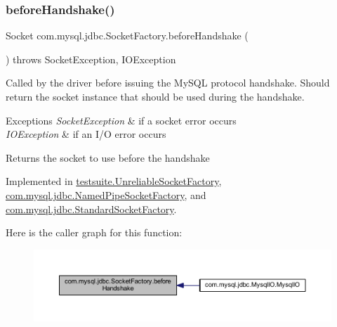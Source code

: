 \subsubsection{\texorpdfstring{before\+Handshake()}{beforeHandshake()}}
{\footnotesize\ttfamily Socket com.\+mysql.\+jdbc.\+Socket\+Factory.\+before\+Handshake (\begin{DoxyParamCaption}{ }\end{DoxyParamCaption}) throws Socket\+Exception, I\+O\+Exception}

Called by the driver before issuing the My\+S\+QL protocol handshake. Should return the socket instance that should be used during the handshake.


\begin{DoxyExceptions}{Exceptions}
{\em Socket\+Exception} & if a socket error occurs \\
\hline
{\em I\+O\+Exception} & if an I/O error occurs\\
\hline
\end{DoxyExceptions}
\begin{DoxyReturn}{Returns}
the socket to use before the handshake 
\end{DoxyReturn}


Implemented in \mbox{\hyperlink{classtestsuite_1_1_unreliable_socket_factory_ad65b14e35905d6b36bf1e93c5b0c90e2}{testsuite.\+Unreliable\+Socket\+Factory}}, \mbox{\hyperlink{classcom_1_1mysql_1_1jdbc_1_1_named_pipe_socket_factory_ad9b744457afb6727e696dc11e69c4b15}{com.\+mysql.\+jdbc.\+Named\+Pipe\+Socket\+Factory}}, and \mbox{\hyperlink{classcom_1_1mysql_1_1jdbc_1_1_standard_socket_factory_a0fc01cf46005340dec4113471621f792}{com.\+mysql.\+jdbc.\+Standard\+Socket\+Factory}}.

Here is the caller graph for this function\+:
\nopagebreak
\begin{figure}[H]
\begin{center}
\leavevmode
\includegraphics[width=350pt]{interfacecom_1_1mysql_1_1jdbc_1_1_socket_factory_aa9a78553a76681f49c734aaa3f8f126b_icgraph}
\end{center}
\end{figure}
\mbox{\label{interfacecom_1_1mysql_1_1jdbc_1_1_socket_factory_a2e5061cef1109ab4689437fe177c4ffe}} 
